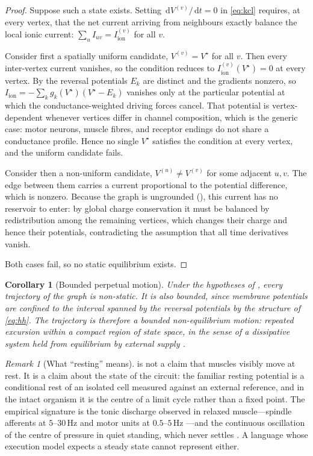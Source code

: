\documentclass[11pt,twocolumn,a4paper]{article}
\theoremstyle{thmstyle}
\newtheorem{corollary}[theorem]{Corollary}
\theoremstyle{definition}
\theoremstyle{remark}
\newtheorem{remark}[theorem]{Remark}
\newcommand{\dd}{\,\mathrm{d}}
\begin{document}
\begin{proof}
Suppose such a state exists. Setting $\dd V^{(v)}/\dd t=0$ in \eqref{eq:kcl}
requires, at every vertex, that the net current arriving from neighbours
exactly balance the local ionic current:
$\sum_u I_{uv}=I_{\mathrm{ion}}^{(v)}$ for all $v$.

Consider first a spatially uniform candidate, $V^{(v)}=V^\star$ for all $v$.
Then every inter-vertex current vanishes, so the condition reduces to
$I_{\mathrm{ion}}^{(v)}(V^\star)=0$ at every vertex. By 
the reversal potentials $E_k$ are distinct and the gradients nonzero, so
$I_{\mathrm{ion}}=-\sum_k g_k(V^\star)(V^\star-E_k)$ vanishes only at the
particular potential at which the conductance-weighted driving forces cancel.
That potential is vertex-dependent whenever vertices differ in channel
composition, which is the generic case: motor neurons, muscle fibres, and
receptor endings do not share a conductance profile. Hence no single $V^\star$
satisfies the condition at every vertex, and the uniform candidate fails.

Consider then a non-uniform candidate, $V^{(u)}\ne V^{(v)}$ for some adjacent
$u,v$. The edge between them carries a current proportional to the potential
difference, which is nonzero. Because the graph is ungrounded
(), this current has no reservoir to enter: by global
charge conservation it must be balanced by redistribution among the remaining
vertices, which changes their charge and hence their potentials, contradicting
the assumption that all time derivatives vanish.

Both cases fail, so no static equilibrium exists.
\end{proof}

\begin{corollary}[Bounded perpetual motion]
\label{cor:perpetual}
Under the hypotheses of , every trajectory of the
graph is non-static. It is also bounded, since membrane potentials are
confined to the interval spanned by the reversal potentials by the structure
of \eqref{eq:hh}. The trajectory is therefore a bounded non-equilibrium
motion: repeated excursion within a compact region of state space, in the
sense of a dissipative system held from equilibrium by external supply
\citep{nicolis1977,onsager1931}.
\end{corollary}

\begin{remark}[What ``resting'' means]
\label{rem:resting}
 is not a claim that muscles visibly move at rest. It is a
claim about the state of the circuit: the familiar resting potential is a
conditional rest of an isolated cell measured against an external reference,
and in the intact organism it is the centre of a limit cycle rather than a
fixed point. The empirical signature is the tonic discharge observed in
relaxed muscle---spindle afferents at $5$--$30$\,Hz and motor units at
$0.5$--$5$\,Hz \citep{burke1976,matthews1972}---and the continuous
oscillation of the centre of pressure in quiet standing, which never settles
\citep{winter1998,zatsiorsky2000,collins1993}. A language whose execution
model expects a steady state cannot represent either.
\end{remark}
\end{document}
